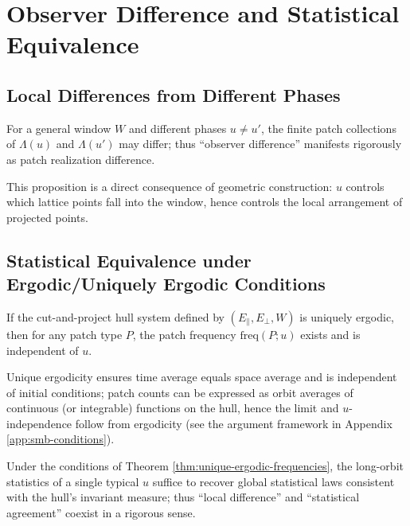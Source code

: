\section{Observer Difference and Statistical Equivalence}

\subsection{Local Differences from Different Phases}

\begin{proposition}\label{prop:local-difference}
For a general window $W$ and different phases $u\neq u'$, the finite patch collections of $\Lambda(u)$ and $\Lambda(u')$ may differ; thus ``observer difference'' manifests rigorously as patch realization difference.
\end{proposition}

\begin{remark}
This proposition is a direct consequence of geometric construction: $u$ controls which lattice points fall into the window, hence controls the local arrangement of projected points.
\end{remark}

\subsection{Statistical Equivalence under Ergodic/Uniquely Ergodic Conditions}

\begin{theorem}\label{thm:unique-ergodic-frequencies}
If the cut-and-project hull system defined by $(E_{\parallel},E_{\perp},W)$ is uniquely ergodic, then for any patch type $P$, the patch frequency $\mathrm{freq}(P;u)$ exists and is independent of $u$.
\end{theorem}

\begin{remark}
Unique ergodicity ensures time average equals space average and is independent of initial conditions; patch counts can be expressed as orbit averages of continuous (or integrable) functions on the hull, hence the limit and $u$-independence follow from ergodicity (see the argument framework in Appendix \ref{app:smb-conditions}).
\end{remark}

\begin{corollary}\label{cor:statistical-holography}
Under the conditions of Theorem \ref{thm:unique-ergodic-frequencies}, the long-orbit statistics of a single typical $u$ suffice to recover global statistical laws consistent with the hull's invariant measure; thus ``local difference'' and ``statistical agreement'' coexist in a rigorous sense.
\end{corollary}
